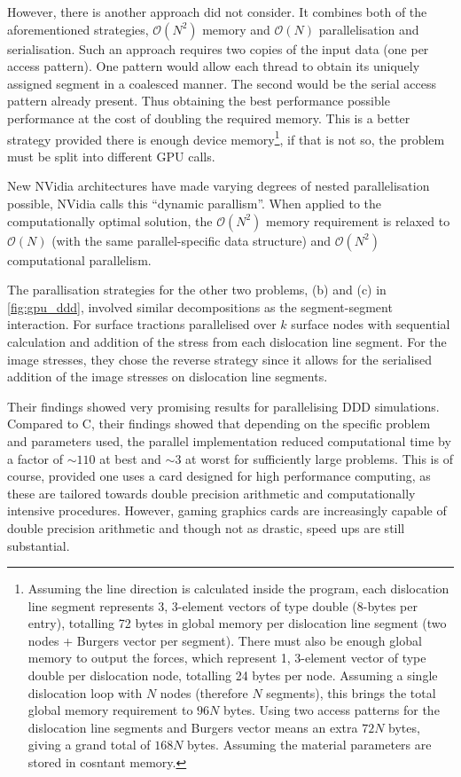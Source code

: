 However, there is another approach \citet{gpu_ddd} did not consider. It combines both of the aforementioned strategies, $ \mathcal{O}(N^{2}) $ memory and $ \mathcal{O}(N) $ parallelisation and serialisation. Such an approach requires two copies of the input data (one per access pattern). One pattern would allow each thread to obtain its uniquely assigned segment in a coalesced manner. The second would be the serial access pattern already present. Thus obtaining the best performance possible performance at the cost of doubling the required memory. This is a better strategy provided there is enough device memory\footnote{Assuming the line direction is calculated inside the program, each dislocation line segment represents 3, 3-element vectors of type double (8-bytes per entry), totalling 72 bytes in global memory per dislocation line segment (two nodes + Burgers vector per segment). There must also be enough global memory to output the forces, which represent 1, 3-element vector of type double per dislocation node, totalling 24 bytes per node. Assuming a single dislocation loop with $ N $ nodes (therefore $ N $ segments), this brings the total global memory requirement to $ 96N $ bytes. Using two access patterns for the dislocation line segments and Burgers vector means an extra $ 72N $ bytes, giving a grand total of $ 168N $ bytes. Assuming the material parameters are stored in cosntant memory.}, if that is not so, the problem must be split into different GPU calls.

New NVidia architectures have made varying degrees of nested parallelisation possible, NVidia calls this ``dynamic parallism''. When applied to the computationally optimal solution, the $ \mathcal{O}(N^{2}) $ memory requirement is relaxed to $ \mathcal{O}(N) $ (with the same parallel-specific data structure) and $ \mathcal{O}(N^{2}) $ computational parallelism.

The parallisation strategies for the other two problems, (b) and (c) in \cref{fig:gpu_ddd}, involved similar decompositions as the segment-segment interaction. For surface tractions \citet{gpu_ddd} parallelised over $ k $ surface nodes with sequential calculation and addition of the stress from each dislocation line segment. For the image stresses, they chose the reverse strategy since it allows for the serialised addition of the image stresses on dislocation line segments.

Their findings showed very promising results for parallelising DDD simulations. Compared to C, their findings showed that depending on the specific problem and parameters used, the parallel implementation reduced computational time by a factor of $ \sim 110 $ at best and $ \sim 3 $ at worst for sufficiently large problems. This is of course, provided one uses a card designed for high performance computing, as these are tailored towards double precision arithmetic and computationally intensive procedures. However, gaming graphics cards are increasingly capable of double precision arithmetic and though not as drastic, speed ups are still substantial.

